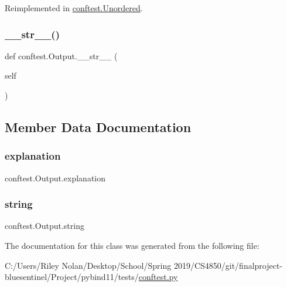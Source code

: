 Reimplemented in \mbox{\hyperlink{classconftest_1_1_unordered_a51a62b504cc6d896bb863a8badcd1fdf}{conftest.\+Unordered}}.

\mbox{\label{classconftest_1_1_output_a540ab88cd67674d1d2e33701a64bbcb6}} 
\subsubsection{\texorpdfstring{\_\_str\_\_()}{\_\_str\_\_()}}
{\footnotesize\ttfamily def conftest.\+Output.\+\_\+\+\_\+str\+\_\+\+\_\+ (\begin{DoxyParamCaption}\item[{}]{self }\end{DoxyParamCaption})}



\subsection{Member Data Documentation}
\mbox{\label{classconftest_1_1_output_a64a26f842f18e50d132ac769f132cfb5}} 
\subsubsection{\texorpdfstring{explanation}{explanation}}
{\footnotesize\ttfamily conftest.\+Output.\+explanation}

\mbox{\label{classconftest_1_1_output_a43bd340fe7a7f5aa82b5f2ee4fab03cc}} 
\subsubsection{\texorpdfstring{string}{string}}
{\footnotesize\ttfamily conftest.\+Output.\+string}



The documentation for this class was generated from the following file\+:\begin{DoxyCompactItemize}
\item 
C\+:/\+Users/\+Riley Nolan/\+Desktop/\+School/\+Spring 2019/\+C\+S4850/git/finalproject-\/bluesentinel/\+Project/pybind11/tests/\mbox{\hyperlink{conftest_8py}{conftest.\+py}}\end{DoxyCompactItemize}
